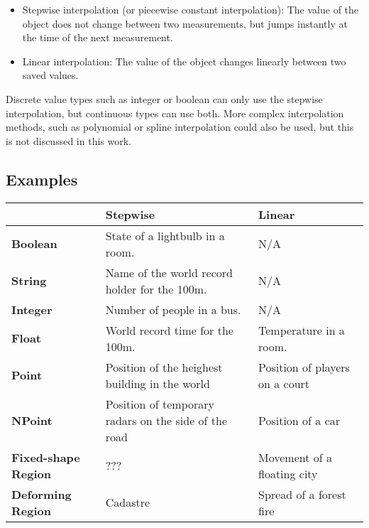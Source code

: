 	\begin{itemize}
		\item Stepwise interpolation (or piecewise constant interpolation): The value of the object does not change between two measurements, but jumps instantly at the time of the next measurement.
		\item Linear interpolation: The value of the object changes linearly between two saved values.
	\end{itemize}

	Discrete value types such as integer or boolean can only use the stepwise interpolation, but continuous types can use both. More complex interpolation methods, such as polynomial or spline interpolation could also be used, but this is not discussed in this work.

	\subsection{Examples}

	\begin{table}[h]
		\centering
		\begin{tabularx}{\textwidth}{
			| >{\raggedright\arraybackslash}X 
  			| >{\raggedright\arraybackslash}X 
  			| >{\raggedright\arraybackslash}X 
			|}
			\hline
			          				& \textbf{Stepwise} 							& \textbf{Linear} 		\\ \hline
			\textbf{Boolean} 		& State of a lightbulb in a room.				&  N/A 				\\ \hline
			\textbf{String} 		& Name of the world record holder for the 100m.	&  N/A       			\\ \hline
			\textbf{Integer} 		& Number of people in a bus.					&  N/A      			\\ \hline
			\textbf{Float} 		& World record time for the 100m.				&  Temperature in a room.		\\ \hline
			\textbf{Point}		& Position of the heighest building in the world	&   Position of players on a court	\\ \hline
			\textbf{NPoint} 		& Position of temporary radars on the side of the road	&   Position of a car       			\\ \hline
			\textbf{Fixed-shape Region} 	& ???	   									&   Movement of a floating city		\\ \hline
			\textbf{Deforming Region} 	& Cadastre         								&   Spread of a forest fire  			\\ \hline
		\end{tabularx}
	\end{table}

